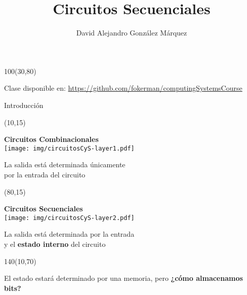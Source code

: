 \documentclass[aspectratio=169]{beamer}
\title{\Huge Circuitos Secuenciales}
\author{David Alejandro González Márquez}
\date{}
\begin{document}
\begin{frame}[plain]
    \titlepage
    \begin{textblock}{100}(30,80)
    \begin{tcolorbox}[size=small,width=\textwidth,colback={gray!30},title={}]
    \begin{center}
     \scriptsize Clase disponible en: \url{https://github.com/fokerman/computingSystemsCourse}
    \end{center}
    \end{tcolorbox}
    \end{textblock}
\end{frame}

\begin{frame}[t]{Introducción}
    \begin{textblock}{65}(10,15)
    \begin{center}
    \textbf{Circuitos Combinacionales}\\
    \vspace{0.5cm}
    \texttt{[image: img/circuitosCyS-layer1.pdf]}
    \end{center}
    La salida está determinada \'unicamente\\ por la entrada del circuito
    \end{textblock}
    \begin{textblock}{65}(80,15)
    \begin{center}
    \textbf{Circuitos Secuenciales}\\
    \vspace{0.5cm}
    \texttt{[image: img/circuitosCyS-layer2.pdf]}
    \end{center}
    La salida está determinada por la entrada\\ y el \textbf{estado interno} del circuito
    \end{textblock}
    \begin{textblock}{140}(10,70)
    \begin{center}
     \color{verdeuca} El estado estará determinado por una memoria, pero \color{naranjauca} \textbf{¿cómo almacenamos bits?}
    \end{center}
    \end{textblock}
\end{frame}
\end{document}
